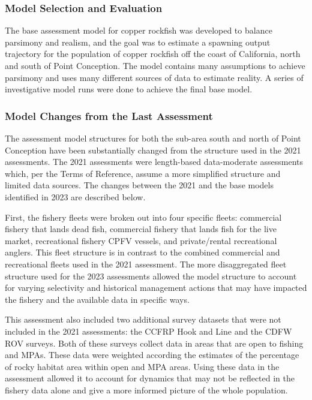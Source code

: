 \documentclass[11pt,
  english,
  letterpaper,
]{article}
\begin{document}
\hypertarget{model-selection-and-evaluation}{%
\subsubsection{Model Selection and Evaluation}\label{model-selection-and-evaluation}}

The base assessment model for copper rockfish was developed to balance parsimony and realism, and the goal was to estimate a spawning output trajectory for the population of copper rockfish off the coast of California, north and south of Point Conception. The model contains many assumptions to achieve parsimony and uses many different sources of data to estimate reality. A series of investigative model runs were done to achieve the final base model.

\hypertarget{model-changes-from-the-last-assessment}{%
\subsubsection{Model Changes from the Last Assessment}\label{model-changes-from-the-last-assessment}}

The assessment model structures for both the sub-area south and north of Point Conception have been substantially changed from the structure used in the 2021 assessments. The 2021 assessments were length-based data-moderate assessments which, per the Terms of Reference, assume a more simplified structure and limited data sources. The changes between the 2021 and the base models identified in 2023 are described below.

First, the fishery fleets were broken out into four specific fleets: commercial fishery that lands dead fish, commercial fishery that lands fish for the live market, recreational fishery CPFV vessels, and private/rental recreational anglers. This fleet structure is in contrast to the combined commercial and recreational fleets used in the 2021 assessment. The more disaggregated fleet structure used for the 2023 assessments allowed the model structure to account for varying selectivity and historical management actions that may have impacted the fishery and the available data in specific ways.

This assessment also included two additional survey datasets that were not included in the 2021 assessments: the CCFRP Hook and Line and the CDFW ROV surveys. Both of these surveys collect data in areas that are open to fishing and MPAs. These data were weighted according the estimates of the percentage of rocky habitat area within open and MPA areas. Using these data in the assessment allowed it to account for dynamics that may not be reflected in the fishery data alone and give a more informed picture of the whole population.
\end{document}
